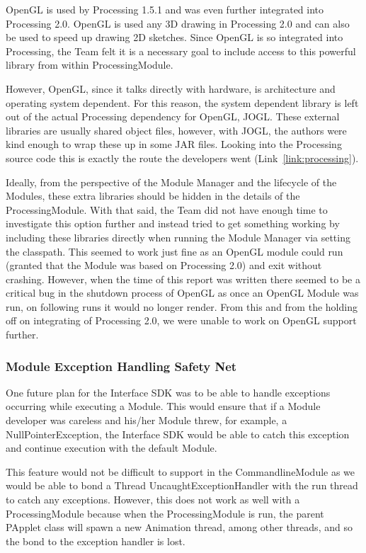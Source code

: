 \documentclass[11pt,letterpaper]{article}
\begin{document}
	OpenGL is used by Processing 1.5.1 and was even further integrated into
	Processing 2.0.  OpenGL is used any 3D drawing in Processing 2.0 and can also
	be used to speed up drawing 2D sketches.  Since OpenGL is so integrated into
	Processing, the Team felt it is a necessary goal to include access to this
	powerful library from within ProcessingModule.

	However, OpenGL, since it talks directly with hardware, is architecture and
	operating system dependent. For this reason, the system dependent library is
	left out of the actual Processing dependency for OpenGL, JOGL.  These external
	libraries are usually shared object files, however, with JOGL, the authors
	were kind enough to wrap these up in some JAR files.  Looking into the
	Processing source code this is exactly the route the developers went
	(Link~\ref{link:processing}). 

	Ideally, from the perspective of the Module Manager and the lifecycle of the
	Modules, these extra libraries should be hidden in the details of the
	ProcessingModule. With that said, the Team did not have enough time to
	investigate this option further and instead tried to get something working by
	including these libraries directly when running the Module Manager via setting
	the classpath. This seemed to work just fine as an OpenGL module could run
	(granted that the Module was based on Processing 2.0) and exit without
	crashing.  However, when the time of this report was written there seemed to
	be a critical bug in the shutdown process of OpenGL as once an OpenGL Module
	was run, on following runs it would no longer render. From this and from the
	holding off on integrating of Processing 2.0, we were unable to work on OpenGL
	support further. 

	\subsubsection{Module Exception Handling Safety Net}
	\label{sec:cont_dev_module_exception}
	One future plan for the Interface SDK was to be able to handle exceptions
	occurring while executing a Module.  This would ensure that if a Module
	developer was careless and his/her Module threw, for example, a
	NullPointerException, the Interface SDK would be able to catch this exception
	and continue execution with the default Module. 

	This feature would not be difficult to support in the CommandlineModule as we
	would be able to bond a Thread UncaughtExceptionHandler with the run thread to
	catch any exceptions.  However, this does not work as well with a
	ProcessingModule because when the ProcessingModule is run, the parent PApplet
	class will spawn a new Animation thread, among other threads, and so the bond
	to the exception handler is lost.
\end{document}
